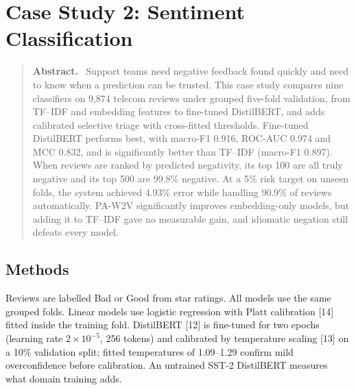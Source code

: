 \documentclass[11pt,a4paper]{article}
\newenvironment{csabstract}{\begin{quote}\small\textbf{Abstract.}\ }{\end{quote}}
\begin{document}
\section{Case Study 2: Sentiment Classification}\label{sec:sent}
\begin{csabstract}
Support teams need negative feedback found quickly and need to know when a prediction can be trusted. This case study compares nine classifiers on 9,874 telecom reviews under grouped five-fold validation, from TF--IDF and embedding features to fine-tuned DistilBERT, and adds calibrated selective triage with cross-fitted thresholds. Fine-tuned DistilBERT performs best, with macro-F1 0.916, ROC-AUC 0.974 and MCC 0.832, and is significantly better than TF--IDF (macro-F1 0.897). When reviews are ranked by predicted negativity, its top 100 are all truly negative and its top 500 are 99.8\% negative. At a 5\% risk target on unseen folds, the system achieved 4.93\% error while handling 90.9\% of reviews automatically. PA-W2V significantly improves embedding-only models, but adding it to TF--IDF gave no measurable gain, and idiomatic negation still defeats every model.
\end{csabstract}
\subsection{Methods}
Reviews are labelled Bad or Good from star ratings. All models use the same grouped folds. Linear models use logistic regression with Platt calibration [14] fitted inside the training fold. DistilBERT [12] is fine-tuned for two epochs (learning rate $2\times10^{-5}$, 256 tokens) and calibrated by temperature scaling [13] on a 10\% validation split; fitted temperatures of 1.09--1.29 confirm mild overconfidence before calibration. An untrained SST-2 DistilBERT measures what domain training adds.
\end{document}
